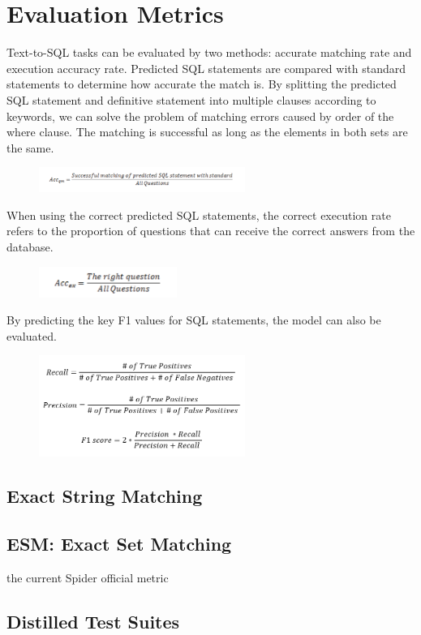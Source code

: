 \section{Evaluation Metrics} \label{eval}

Text-to-SQL tasks can be evaluated by two methods: accurate matching rate and execution accuracy rate. Predicted SQL statements are compared with standard statements to determine how accurate the match is.
By splitting the predicted SQL statement and definitive statement into multiple clauses according to keywords, we can solve the problem of matching errors caused by order of the where clause. The matching is successful as long as the elements in both sets are the same.

\begin{figure}[htb]
    \centering
    \includegraphics[width=0.6\textwidth]{pics/acc1.png}
    \label{fig:acc1}
\end{figure}

When using the correct predicted SQL statements, the correct execution rate refers to the proportion of questions that can receive the correct answers from the database.

\begin{figure}[htb]
    \centering
    \includegraphics[width=0.4\textwidth]{pics/acc2.png}
    \label{fig:acc2}
\end{figure}

By predicting the key F1 values for SQL statements, the model can also be evaluated.

\begin{figure}[htb]
    \centering
    \includegraphics[width=0.6\textwidth]{pics/f1.png}
    \label{fig:f1}
\end{figure}

\subsection{Exact String Matching}
\subsection{ESM: Exact Set Matching}

the current Spider official metric

\subsection{Distilled Test Suites}
